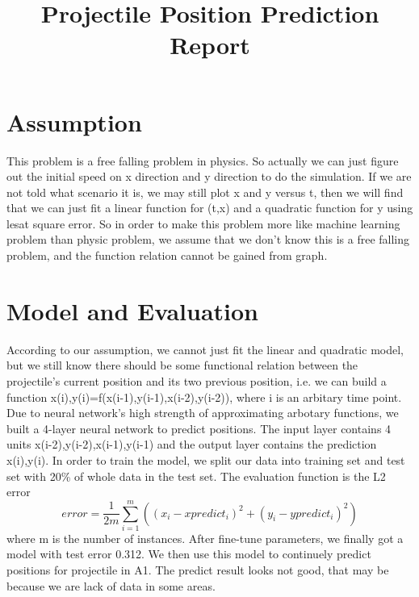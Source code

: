 \documentclass{article}
\title{Projectile Position Prediction Report}
\begin{document}
\maketitle

\section{Assumption}
This problem is a free falling problem in physics. So actually we can just 
figure out the initial speed on x direction and y direction to do the 
simulation. If we are not told what scenario it is, we may still plot x and y 
versus t, then we will find that we can just fit a linear function for (t,x) 
and a quadratic function for y using lesat square error. So in order to make 
this problem more like machine learning problem than physic problem, we assume 
that we don't know this is a free falling problem, and the function relation 
cannot be gained from graph.

\section{Model and Evaluation}
According to our assumption, we cannot just fit the linear and quadratic model, 
but we still know there should be some functional relation between the 
projectile's current position and its two previous position, i.e. we can build 
a function x(i),y(i)=f(x(i-1),y(i-1),x(i-2),y(i-2)), where i is an arbitary 
time point. Due to neural network's high strength of approximating arbotary 
functions, we built a 4-layer neural network to predict positions. The input 
layer contains 4 units x(i-2),y(i-2),x(i-1),y(i-1) and the output layer 
contains the prediction x(i),y(i). In order to train the model, we split our 
data into training set and test set with 20\% of whole data in the test set. 
The evaluation function is the L2 error
\begin{equation}\label{eq1}
error=\frac{1}{2m}\sum_{i=1}^{m}((x_i-xpredict_i)^{2}+(y_i-ypredict_i)^{2})
\end{equation}
where m is the number of instances. After fine-tune parameters, we finally got 
a model with test error 0.312. We then use this model to continuely predict 
positions for projectile in A1. The predict result looks not good, that may be 
because we are lack of data in some areas.
\end{document}
